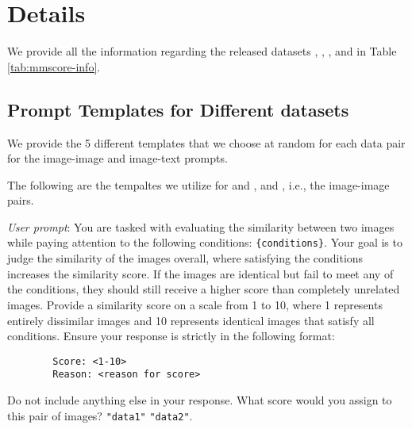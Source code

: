 \section{\mmscore{} Details}
\label{sec:mmscore-info}
We provide all the information regarding the released datasets \mmscorecoco, \mmscorein, \mmscorewuimgimg, and \mmscorewuimgtext{} in Table \ref{tab:mmscore-info}.


\subsection{Prompt Templates for Different \mmscore{} datasets}
\label{sec:prompt-templates}
We provide the 5 different templates that we choose at random for each data pair for the image-image and image-text prompts.

The following are the tempaltes we utilize for \mmscorecoco and \mmscorein, and \mmscorewuimgimg, i.e., the image-image pairs.

\begin{tcolorbox}[enhanced,attach boxed title to top center={yshift=-3mm,yshifttext=-1mm},
  colback=blue!5!white,colframe=blue!20!gray,colbacktitle=blue!20!gray,
  title=Image-Image Prompt Template V1,fonttitle=\bfseries,
  boxed title style={size=small,colframe=blue!20!gray} ]

        \emph{User prompt}: You are tasked with evaluating the similarity between two images while paying attention to the following conditions: \texttt{\{conditions\}}. Your goal is to judge the similarity of the images overall, where satisfying the conditions increases the similarity score. If the images are identical but fail to meet any of the conditions, they should still receive a higher score than completely unrelated images. Provide a similarity score on a scale from 1 to 10, where 1 represents entirely dissimilar images and 10 represents identical images that satisfy all conditions. Ensure your response is strictly in the following format:
        
        \begin{verbatim}
        Score: <1-10>
        Reason: <reason for score>
        \end{verbatim}
                
        Do not include anything else in your response. What score would you assign to this pair of images? \texttt{"data1"} \texttt{"data2"}.

\end{tcolorbox}

